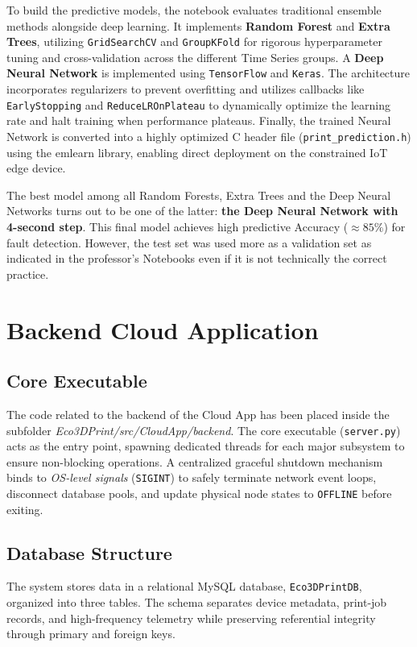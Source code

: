 To build the predictive models, the notebook evaluates traditional ensemble methods alongside deep learning. It implements \textbf{Random Forest} and \textbf{Extra Trees}, utilizing \texttt{GridSearchCV} and \texttt{GroupKFold} for rigorous hyperparameter tuning and cross-validation across the different Time Series groups. A \textbf{Deep Neural Network} is implemented using \texttt{TensorFlow} and \texttt{Keras}. The architecture incorporates regularizers to prevent overfitting and utilizes callbacks like \texttt{EarlyStopping} and \texttt{ReduceLROnPlateau} to dynamically optimize the learning rate and halt training when performance plateaus. Finally, the trained Neural Network is converted into a highly optimized C header file (\texttt{print\_prediction.h}) using the emlearn library, enabling direct deployment on the constrained IoT edge device. 

\medspace

The best model among all Random Forests, Extra Trees and the Deep Neural Networks turns out to be one of the latter: \textbf{the Deep Neural Network with 4-second step}. This final model achieves high predictive Accuracy ($\approx 85\%$) for fault detection. However, the test set was used more as a validation set as indicated in the professor's Notebooks even if it is not technically the correct practice. 

\newpage

\section{Backend Cloud Application}
\subsection{Core Executable}
The code related to the backend of the Cloud App has been placed inside the subfolder \linebreak \textit{Eco3DPrint/src/CloudApp/backend}. The core executable (\texttt{server.py}) acts as the entry point, spawning dedicated threads for each major subsystem to ensure non-blocking operations. A centralized graceful shutdown mechanism binds to \textit{OS-level signals} (\texttt{SIGINT}) to safely terminate network event loops, disconnect database pools, and update physical node states to \texttt{OFFLINE} before exiting.

\subsection{Database Structure}
The system stores data in a relational MySQL database, \texttt{Eco3DPrintDB}, organized into three tables. The schema separates device metadata, print-job records, and high-frequency telemetry while preserving referential integrity through primary and foreign keys.


